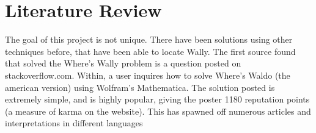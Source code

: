 \documentclass[../main.tex]{subfiles}
\begin{document}
  \section{Literature Review}
    The goal of this project is not unique.
    There have been solutions using other techniques before, that have been able to locate Wally.
    The first source found that solved the Where's Wally problem is a question posted on stackoverflow.com\cite{url:stackoverflowmathematica}.
    Within, a user inquires how to solve Where's Waldo (the american version) using Wolfram's Mathematica.
    The solution posted is extremely simple, and is highly popular, giving the poster 1180 reputation points (a measure of karma on the website).
    This has spawned off numerous articles and interpretations in different languages \cite{url:stackoverflowr,url:stackoverflowpython} 
    \biblio 
\end{document}
